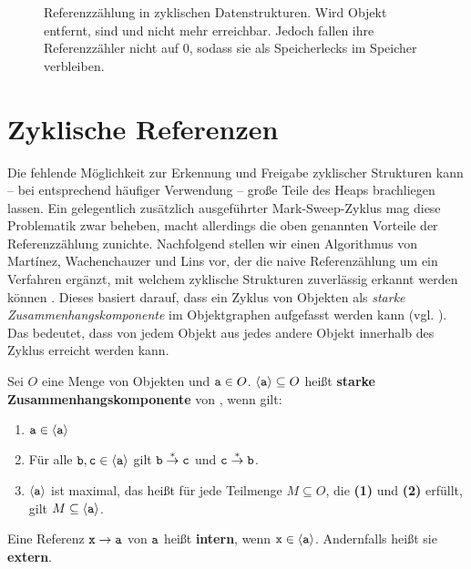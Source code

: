 \begin{figure}[h]
	\centering
	
	\caption[Referenzzählung in zyklischen Datenstrukturen]{Referenzzählung in zyklischen Datenstrukturen. Wird Objekt  entfernt, sind  und  nicht mehr erreichbar. Jedoch fallen ihre Referenzzähler nicht auf $0$, sodass sie als Speicherlecks im Speicher verbleiben.}
	\label{fig:rc-cycle}
\end{figure}

\section{Zyklische Referenzen}
\label{sec:cyclic-rc}
Die fehlende Möglichkeit zur Erkennung und Freigabe zyklischer Strukturen kann -- bei entsprechend häufiger Verwendung -- große Teile des Heaps brachliegen lassen.
Ein gelegentlich zusätzlich ausgeführter Mark-Sweep-Zyklus mag diese Problematik zwar beheben, macht allerdings die oben genannten Vorteile der Referenzzählung zunichte.
Nachfolgend stellen wir einen Algorithmus von Martínez, Wachenchauzer und Lins vor, der die naive Referenzählung um ein Verfahren ergänzt, mit welchem zyklische Strukturen zuverlässig erkannt werden können \cite{martinez1990}.
Dieses basiert darauf, dass ein Zyklus von Objekten als \textit{starke Zusammenhangskomponente} im Objektgraphen aufgefasst werden kann (vgl. \cite[S. 348]{linhou2006}).
Das bedeutet, dass von jedem Objekt aus jedes andere Objekt innerhalb des Zyklus erreicht werden kann.

\begin{mybox}
\begin{defn}
\label{def:zusammenhang}
	Sei $O$ eine Menge von Objekten und $\texttt{a} \in O$.
	$\left\langle\texttt{a}\right\rangle \subseteq O$ heißt \textbf{starke Zusammenhangskomponente} von , wenn gilt:
	\begin{enumerate}[(1)]
		\item $\texttt{a} \in \left\langle\texttt{a}\right\rangle$
		\item Für alle $\texttt{b}, \texttt{c} \in \left\langle\texttt{a}\right\rangle$ gilt $\texttt{b} \overset{*}{\rightarrow} \texttt{c}$ und $\texttt{c} \overset{*}{\rightarrow} \texttt{b}$.
		\item $\left\langle\texttt{a}\right\rangle$ ist maximal, das heißt für jede Teilmenge $M \subseteq O$, die \textbf{(1)} und \textbf{(2)} erfüllt, gilt $M \subseteq \left\langle\texttt{a}\right\rangle$.
	\end{enumerate}
	Eine Referenz $\texttt{x} \rightarrow \texttt{a}$ von $\texttt{a}$ heißt \textbf{intern}, wenn $\texttt{x} \in \left\langle\texttt{a}\right\rangle$.
	Andernfalls heißt sie \textbf{extern}.	
\end{defn}
\end{mybox}

